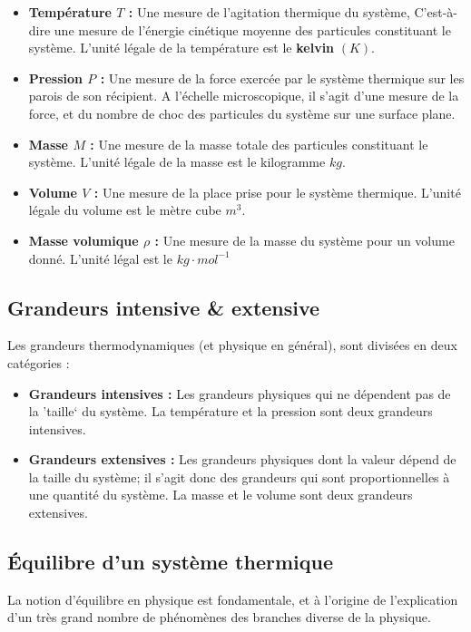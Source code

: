 \documentclass[11pt,a4paper]{article}
\begin{document}
\begin{itemize}
    \item \textbf{Température $T$ : } Une mesure de l'agitation thermique du système, C'est-à-dire une mesure de l'énergie cinétique moyenne des particules constituant le système. L'unité légale de la température est le \textbf{kelvin} $(K)$. 
    \item \textbf{Pression $P$ :} Une mesure de la force exercée par le système thermique sur les parois de son récipient. A l'échelle microscopique, il s'agit d'une mesure de la force, et du nombre de choc des particules du système sur une surface plane. 
    \item \textbf{Masse $M$ :} Une mesure de la masse totale des particules constituant le système. L'unité légale de la masse est le kilogramme $kg$.
    \item \textbf{Volume $V$ :} Une mesure de la place prise pour le système thermique. L'unité légale du volume est le mètre cube $m^3$.
    \item \textbf{Masse volumique $\rho$ : } Une mesure de la masse du système pour un volume donné. L'unité légal est le $kg\cdot mol^{-1}$ 
\end{itemize}

\subsection{Grandeurs intensive \& extensive}

Les grandeurs thermodynamiques (et physique en général), sont divisées en deux catégories : 
\begin{itemize}
    \item \textbf{Grandeurs intensives :} Les grandeurs physiques qui ne dépendent pas de la 'taille` du système. La température et la pression sont deux grandeurs intensives. 
    \item \textbf{Grandeurs extensives :} Les grandeurs physiques dont la valeur dépend de la taille du système; il s'agit donc des grandeurs qui sont proportionnelles à une quantité du système. La masse et le volume sont deux grandeurs extensives. 
\end{itemize}

\subsection{Équilibre d'un système thermique}

La notion d'équilibre en physique est fondamentale, et à l'origine de l'explication d'un très grand nombre de phénomènes des branches diverse de la physique. 
\end{document}
